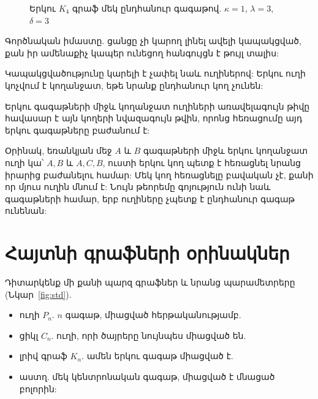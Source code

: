 \begin{figure}[h]
\centering
{}
\caption{Երկու $K_4$ գրաֆ մեկ ընդհանուր գագաթով. $\kappa=1$, $\lambda=3$, $\delta=3$}\label{fig:k4}
\end{figure}

Գործնական իմաստը. ցանցը չի կարող լինել ավելի կապակցված, քան իր ամենաքիչ կապեր ունեցող հանգույցն է թույլ տալիս:

Կապակցվածությունը կարելի է չափել նաև ուղիներով: Երկու ուղի կոչվում է կողանջատ, եթե նրանք ընդհանուր կող չունեն:

\begin{theorem}[Մենգեր]
Երկու գագաթների միջև կողանջատ ուղիների առավելագույն թիվը հավասար է այն կողերի նվազագույն թվին, որոնց հեռացումը այդ երկու գագաթները բաժանում է:
\end{theorem}

Օրինակ, եռանկյան մեջ $A$ և $B$ գագաթների միջև երկու կողանջատ ուղի կա՝ $A,B$ և $A,C,B$, ուստի երկու կող պետք է հեռացնել նրանց իրարից բաժանելու համար: Մեկ կող հեռացնելը բավական չէ, քանի որ մյուս ուղին մնում է: Նույն թեորեմը գոյություն ունի նաև գագաթների համար, երբ ուղիները չպետք է ընդհանուր գագաթ ունենան:

\section{Հայտնի գրաֆների օրինակներ}

Դիտարկենք մի քանի պարզ գրաֆներ և նրանց պարամետրերը (Նկար~\ref{fig:std}).
\begin{itemize}
  \item ուղի $P_n$. $n$ գագաթ, միացված հերթականությամբ.
  \item ցիկլ $C_n$. ուղի, որի ծայրերը նույնպես միացված են.
  \item լրիվ գրաֆ $K_n$. ամեն երկու գագաթ միացված է.
  \item աստղ. մեկ կենտրոնական գագաթ, միացված է մնացած բոլորին:
\end{itemize}

